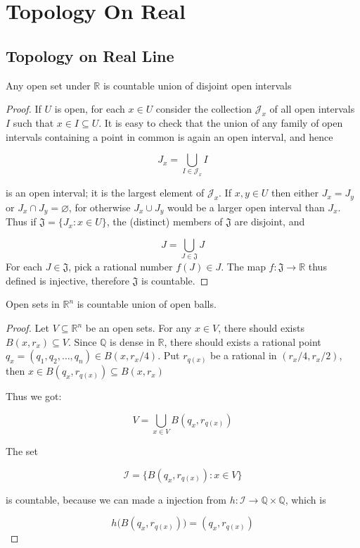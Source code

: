 \section{Topology On Real}

\subsection{Topology on Real Line}

\begin{thm}
    Any open set under $\mathbb{R}$ is countable union
    of disjoint open intervals
\end{thm}

\begin{proof}
    If $U$ is open, for each $x \in U$ consider the collection $\mathcal{J}_x$ of all open
intervals $I$ such that $x \in I \subseteq U$. It is easy to check that the union of any family
of open intervals containing a point in common is again an open interval, and hence

\[
    J_x = \bigcup_{I \in \mathcal{J}_x} I
\]

is an open interval; it is the largest element of $\mathcal{J}_x$. If $x, y \in U$ then
either $J_x = J_y$ or $J_x \cap J_y = \varnothing$, for otherwise $J_x \cup J_y$ 
would be a larger open interval
than $J_x$. Thus if $\mathfrak{J} = \{ J_x : x \in U \}$, the (distinct) members of $\mathfrak{J}$ are disjoint,
and 

\[
J = \bigcup_{J \in \mathfrak{J}} J
\]
For each $J \in \mathfrak{J}$, pick a rational number $f(J) \in J$. The map
$f : \mathfrak{J} \to \mathbb{R}$ thus defined is injective,  therefore $\mathfrak{J}$ is
countable.
\end{proof}

\begin{thm}
    Open sets in $\mathbb{R}^n$ is countable union of open balls.
\end{thm}

\begin{proof}
   Let $V \subseteq \mathbb{R}^n$ be an open sets. For any $x \in V$, there should exists $B(x, r_x) \subseteq V$. 
   Since $\mathbb{Q}$ is dense in $\mathbb{R}$, there should exists a rational point $q_x = (q_1,q_2,\dots,q_n) \in B(x, r_x/4)$.
   Put $r_{q(x)}$ be a rational in $(r_x /4 ,r_x/2)$, then $x \in B(q_x, r_{q(x)}) \subseteq B(x, r_x)$

   Thus we got:

   \[
    V = \bigcup_{x \in V} B(q_x ,r_{q(x)})
   \]

   The set

   \[
    \mathcal{I} = \{ B(q_x, r_{q(x)}): x \in V\}
   \]

   is countable, because we can made a injection from $h: \mathcal{I} \to \mathbb{Q} \times \mathbb{Q}$, which is 

   \[
    h\Big(B(q_x, r_{q(x)})\Big) = (q_x, r_{q(x)})
   \]
\end{proof}
